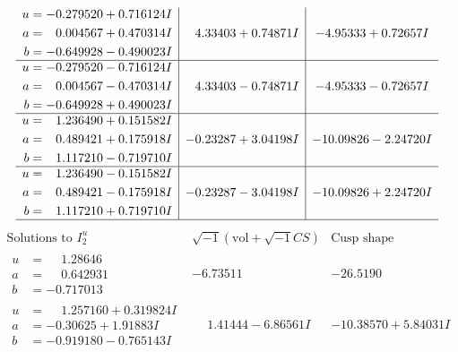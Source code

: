 \documentclass[1p]{elsarticle_modified}
\theoremstyle{definition}
\newcommand{\I}{\sqrt{-1}}
\begin{document}
$$\begin{array}{c|c|c}
\begin{aligned}
u &= -0.279520 + 0.716124 I \\
a &= \phantom{-}0.004567 + 0.470314 I \\
b &= -0.649928 - 0.490023 I\end{aligned}
 & \phantom{-}4.33403 + 0.74871 I & -4.95333 + 0.72657 I \\ \hline\begin{aligned}
u &= -0.279520 - 0.716124 I \\
a &= \phantom{-}0.004567 - 0.470314 I \\
b &= -0.649928 + 0.490023 I\end{aligned}
 & \phantom{-}4.33403 - 0.74871 I & -4.95333 - 0.72657 I \\ \hline\begin{aligned}
u &= \phantom{-}1.236490 + 0.151582 I \\
a &= \phantom{-}0.489421 + 0.175918 I \\
b &= \phantom{-}1.117210 - 0.719710 I\end{aligned}
 & -0.23287 + 3.04198 I & -10.09826 - 2.24720 I \\ \hline\begin{aligned}
u &= \phantom{-}1.236490 - 0.151582 I \\
a &= \phantom{-}0.489421 - 0.175918 I \\
b &= \phantom{-}1.117210 + 0.719710 I\end{aligned}
 & -0.23287 - 3.04198 I & -10.09826 + 2.24720 I\\
 \hline 
 \end{array}$$\newpage$$\begin{array}{c|c|c}  
\text{Solutions to }I^u_{2}& \I (\text{vol} + \sqrt{-1}CS) & \text{Cusp shape}\\
 \hline 
\begin{aligned}
u &= \phantom{-}1.28646\phantom{ +0.000000I} \\
a &= \phantom{-}0.642931\phantom{ +0.000000I} \\
b &= -0.717013\phantom{ +0.000000I}\end{aligned}
 & -6.73511\phantom{ +0.000000I} & -26.5190\phantom{ +0.000000I} \\ \hline\begin{aligned}
u &= \phantom{-}1.257160 + 0.319824 I \\
a &= -0.30625 + 1.91883 I \\
b &= -0.919180 - 0.765143 I\end{aligned}
 & \phantom{-}1.41444 - 6.86561 I & -10.38570 + 5.84031 I \\ \hline\begin{aligned}

\end{aligned}
\end{array}$$
\end{document}
